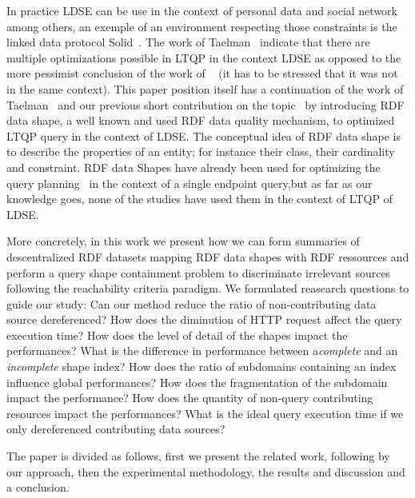 In practice LDSE can be use in the context of personal data and social network among others,
an exemple of an environment respecting those constraints is the linked data protocol Solid~\cite{Taelman2023}.
The work of Taelman~\cite{Taelman2023} indicate that there are multiple optimizations possible in LTQP in the context LDSE as opposed to the
more pessimist conclusion of the work of ~\citeauthor{hartig2016walking} (it has to be stressed that it was not in the same context).
This paper position itself has a continuation of the work of Taelman~\cite{Taelman2023} and our previous short contribution on the topic~\cite{tam2024opportunitiesshapebasedoptimizationlink} 
by introducing RDF data shape, a well known and used RDF data quality mechanism, to optimized LTQP query in the context of LDSE.
The conceptual idea of RDF data shape is to describe the properties of an entity;
for instance their class, their cardinality and constraint.
RDF data Shapes have already been used for optimizing the query planning~\cite{kashif2021}
in the context of a single endpoint query,but as far as our knowledge goes, none of the studies have used them in the context of LTQP of LDSE.


More concretely, in this work we present how we can form summaries of descentralized RDF datasets mapping RDF data shapes with RDF ressources and perform 
a query shape containment problem to discriminate irrelevant sources following the reachability criteria paradigm.
We formulated reasearch questions to guide our study:
Can our method reduce the ratio of non-contributing data source dereferenced?
How does the diminution of HTTP request affect the query execution time?
How does the level of detail of the shapes impact the performances?
What is the difference in performance between a\emph{complete} and an \emph{incomplete} shape index?
How does the ratio of subdomains containing an index influence global performances?
How does the fragmentation of the subdomain impact the performance?
How does the quantity of non-query contributing resources impact the performances?
What is the ideal query execution time if we only dereferenced contributing data sources?

The paper is divided as follows, first we present the related work, following by our approach, then the
experimental methodology, the results and discussion and a conclusion.